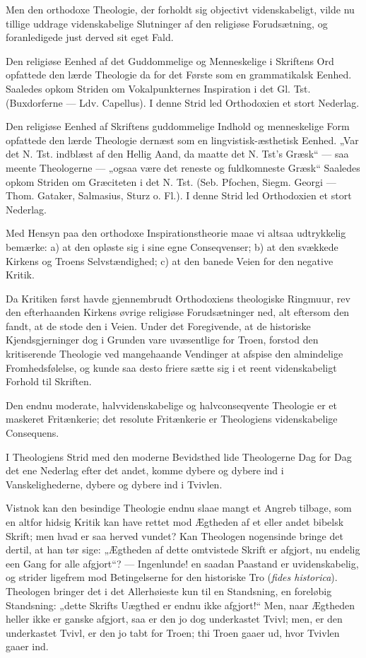 \documentclass[12pt,a4paper]{book}
\newcommand{\opage}[1]{\marginnote{\footnotesize\textit{[#1]}}}
\begin{document}
Men den orthodoxe Theologie, der forholdt sig objectivt
videnskabeligt, vilde nu tillige uddrage videnskabelige Slutninger af
den religiøse Forudsætning, og foranledigede just derved sit eget
Fald.

Den religiøse Eenhed af det Guddommelige og Menneskelige i Skriftens
Ord opfattede den lærde Theologie da for det Første som en
grammatikalsk Eenhed. Saaledes opkom Striden om
Vokalpunkternes Inspiration i det Gl. Tst. (Buxdorferne --- Ldv.
Capellus). I denne Strid led Orthodoxien et stort Nederlag.

Den religiøse Eenhed af Skriftens guddommelige Indhold og
menneskelige Form opfattede den lærde Theologie dernæst som en
lingvistisk-æsthetisk Eenhed. „Var det N. Tst. indblæst af den Hellig
Aand, da maatte det N. Tst's Græsk“ --- saa meente Theologerne ---
„ogsaa være det reneste og fuldkomneste Græsk“
Saaledes opkom Striden om Græciteten i det N. Tst. (Seb. Pfochen,
Siegm. Georgi --- Thom. Gataker, Salmasius, Sturz o. Fl.). I denne
Strid led Orthodoxien et stort Nederlag.

Med Hensyn paa den orthodoxe Inspirationstheorie maae vi altsaa
udtrykkelig bemærke: a) at den opløste sig i sine egne Conseqvenser;
b) at den svækkede Kirkens og Troens Selvstændighed; c) at den banede
Veien for den negative Kritik.

Da Kritiken først havde gjennembrudt Orthodoxiens theologiske
Ringmuur, rev den efterhaanden Kirkens øvrige religiøse
Forudsætninger ned, alt eftersom den fandt, at de stode den i Veien.
Under det Foregivende, at de historiske Kjendsgjerninger dog i
\opage{36} Grunden vare uvæsentlige for Troen, forstod den kritiserende
Theologie ved mangehaande Vendinger at afspise den almindelige
Fromhedsfølelse, og kunde saa desto friere sætte sig i et reent
videnskabeligt Forhold til Skriften.

Den endnu moderate, halvvidenskabelige og halvconseqvente Theologie
er et maskeret Fritænkerie; det resolute Fritænkerie er Theologiens
videnskabelige Consequens.

I Theologiens Strid med den moderne Bevidsthed lide Theologerne Dag
for Dag det ene Nederlag efter det andet, komme dybere og dybere ind
i Vanskelighederne, dybere og dybere ind i Tvivlen.

Vistnok kan den besindige Theologie endnu slaae mangt et Angreb
tilbage, som en altfor hidsig Kritik kan have rettet mod Ægtheden af
et eller andet bibelsk Skrift; men hvad er saa herved vundet? Kan
Theologen nogensinde bringe det dertil, at han tør sige: „Ægtheden af
dette omtvistede Skrift er afgjort, nu endelig een Gang for alle
afgjort“? --- Ingenlunde! en saadan Paastand er uvidenskabelig, og
strider ligefrem mod Betingelserne for den historiske Tro
(\textit{fides historica}). Theologen bringer det i det Allerhøieste
kun til en Standsning, en foreløbig Standsning: „dette Skrifts
Uægthed er endnu ikke afgjort!“ Men, naar Ægtheden heller ikke er
ganske afgjort, saa er den jo dog underkastet Tvivl; men, er den
underkastet Tvivl, er den jo tabt for Troen; thi Troen gaaer ud, hvor
Tvivlen gaaer ind.
\end{document}
